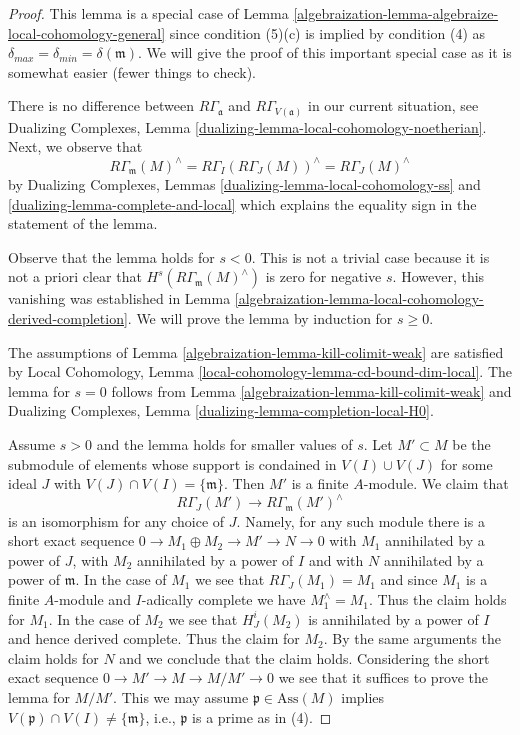 \begin{proof}

This lemma is a special case of
Lemma \ref{algebraization-lemma-algebraize-local-cohomology-general}
since condition (5)(c) is implied by condition (4)
as $\delta_{max} = \delta_{min} = \delta(\mathfrak m)$.
We will give the proof of this important special case
as it is somewhat easier (fewer things to check).

\medskip\noindent
There is no difference between $R\Gamma_\mathfrak a$ and
$R\Gamma_{V(\mathfrak a)}$ in our current situation, see
Dualizing Complexes, Lemma \ref{dualizing-lemma-local-cohomology-noetherian}.
Next, we observe that
$$
R\Gamma_\mathfrak m(M)^\wedge =
R\Gamma_I(R\Gamma_J(M))^\wedge =
R\Gamma_J(M)^\wedge
$$
by Dualizing Complexes, Lemmas \ref{dualizing-lemma-local-cohomology-ss} and
\ref{dualizing-lemma-complete-and-local}
which explains the equality sign in the statement of the lemma.

\medskip\noindent
Observe that the lemma holds for $s < 0$. This is not a trivial case because
it is not a priori clear that $H^s(R\Gamma_\mathfrak m(M)^\wedge)$
is zero for negative $s$. However, this vanishing was established
in Lemma \ref{algebraization-lemma-local-cohomology-derived-completion}.
We will prove the lemma by induction for $s \geq 0$.

\medskip\noindent
The assumptions of Lemma \ref{algebraization-lemma-kill-colimit-weak}
are satisfied by Local Cohomology, Lemma
\ref{local-cohomology-lemma-cd-bound-dim-local}.
The lemma for $s = 0$ follows from Lemma \ref{algebraization-lemma-kill-colimit-weak} and
Dualizing Complexes, Lemma \ref{dualizing-lemma-completion-local-H0}.

\medskip\noindent
Assume $s > 0$ and the lemma holds for smaller values of $s$.
Let $M' \subset M$ be the submodule of elements whose
support is condained in $V(I) \cup V(J)$ for some
ideal $J$ with $V(J) \cap V(I) = \{\mathfrak m\}$.
Then $M'$ is a finite $A$-module.
We claim that
$$
R\Gamma_J(M') \to R\Gamma_\mathfrak m(M')^\wedge
$$
is an isomorphism for any choice of $J$.
Namely, for any such module there is a short exact sequence
$0 \to M_1 \oplus M_2 \to M' \to N \to 0$ with
$M_1$ annihilated by a power of $J$, with $M_2$ annihilated
by a power of $I$ and with $N$ annihilated by a power of $\mathfrak m$.
In the case of $M_1$ we see that $R\Gamma_J(M_1) = M_1$ and
since $M_1$ is a finite $A$-module and $I$-adically complete
we have $M_1^\wedge = M_1$. Thus the claim holds for $M_1$.
In the case of $M_2$ we see that $H^i_J(M_2)$ is annihilated
by a power of $I$ and hence derived complete. Thus the claim
for $M_2$. By the same arguments the claim holds for $N$
and we conclude that the claim holds. Considering the
short exact sequence $0 \to M' \to M \to M/M' \to 0$
we see that it suffices to prove the lemma for $M/M'$.
This we may assume $\mathfrak p \in \text{Ass}(M)$
implies $V(\mathfrak p) \cap V(I) \not = \{\mathfrak m\}$, i.e.,
$\mathfrak p$ is a prime as in (4).


\end{proof}
